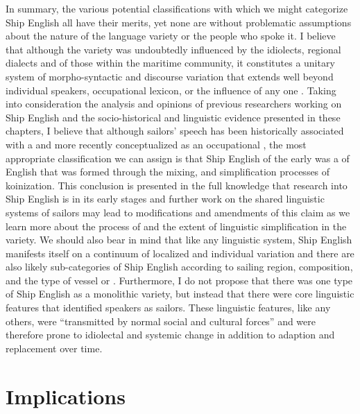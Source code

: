 In summary, the various potential classifications with which we might categorize Ship English all have their merits, yet none are without problematic assumptions about the nature of the language variety or the people who spoke it. I believe that although the variety was undoubtedly influenced by the idiolects, regional dialects and  of those within the maritime community, it constitutes a unitary system of morpho-syntactic and discourse variation that extends well beyond individual speakers, occupational lexicon, or the influence of any one . Taking into consideration the analysis and opinions of previous researchers working on Ship English and the socio-historical and linguistic evidence presented in these chapters, I believe that although sailors’ speech has been historically associated with a  and more recently conceptualized as an occupational , the most appropriate classification we can assign is that Ship English of the early  was a  of English that was formed through the mixing,  and simplification processes of koinization. This conclusion is presented in the full knowledge that research into Ship English is in its early stages and further work on the shared linguistic systems of sailors may lead to modifications and amendments of this claim as we learn more about the process of  and the extent of linguistic simplification in the variety. We should also bear in mind that like any linguistic system, Ship English manifests itself on a continuum of localized and individual variation and there are also likely sub-categories of Ship English according to sailing region,  composition, and the type of vessel or . Furthermore, I do not propose that there was one type of Ship English as a monolithic variety, but instead that there were core linguistic features that identified speakers as sailors. These linguistic features, like any others, were “transmitted by normal social and cultural forces” \citep[129]{McDavid1979} and were therefore prone to idiolectal and systemic change in addition to adaption and replacement over time.

\section{{Implications}}%

